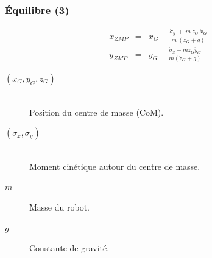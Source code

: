 \documentclass[14pt,utf8,hyperref={pdfpagelabels=false}]{beamer}
\begin{document}
\begin{slideDecision}
  \frametitle{Équilibre (3)}


  \begin{changeleftmargin}{1.1cm}
  \begin{center}
    \begin{equation*}
    \begin{array}{lll}
    x_{ZMP} &=& x_G -
    \frac{\dot{\sigma}_y\ +\ m\ z_G\ \ddot{x}_G}{m\ (\ddot{z}_G + g)}\\
    y_{ZMP} &=& y_G +
    \frac{\dot{\sigma}_x - m z_G \ddot{y}_G}{m (\ddot{z}_G + g)}
    \end{array}
  \end{equation*}

  \end{center}

  \begin{description}
    \item[$(x_G, y_G, z_G)$]~\\
      Position du centre de masse (CoM).
    \item[$(\sigma_x, \sigma_y)$]~\\
      Moment cinétique autour du centre de masse.
    \item[$m$] Masse du robot.
    \item[$g$] Constante de gravité.
  \end{description}

  \end{changeleftmargin}
\end{slideDecision}
\end{document}
